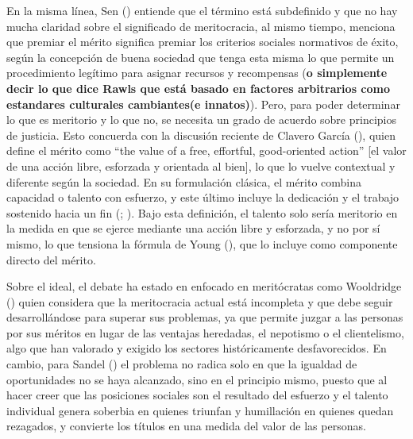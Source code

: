 \documentclass[
  spanish,
  a4paper,
  oneside]{scrbook}
\begin{document}
En la misma línea, Sen ()
entiende que el término está subdefinido y que no hay mucha claridad
sobre el significado de meritocracia, al mismo tiempo, menciona que
premiar el mérito significa premiar los criterios sociales normativos de
éxito, según la concepción de buena sociedad que tenga esta misma lo que
permite un procedimiento legítimo para asignar recursos y recompensas
(\textbf{o simplemente decir lo que dice Rawls que está basado en
factores arbitrarios como estandares culturales cambiantes(e innatos)}).
Pero, para poder determinar lo que es meritorio y lo que no, se necesita
un grado de acuerdo sobre principios de justicia. Esto concuerda con la
discusión reciente de Clavero García (), quien define el mérito como ``the value of a free, effortful,
good-oriented action'' {[}el valor de una acción libre, esforzada y
orientada al bien{]}, lo que lo vuelve contextual y diferente según la
sociedad. En su formulación clásica, el mérito combina capacidad o
talento con esfuerzo, y este último incluye la dedicación y el trabajo
sostenido hacia un fin (; ).
Bajo esta definición, el talento solo sería meritorio en la medida en
que se ejerce mediante una acción libre y esforzada, y no por sí mismo,
lo que tensiona la fórmula de Young (),
que lo incluye como componente directo del mérito.

Sobre el ideal, el debate ha estado en enfocado en meritócratas como
Wooldridge () quien
considera que la meritocracia actual está incompleta y que debe seguir
desarrollándose para superar sus problemas, ya que permite juzgar a las
personas por sus méritos en lugar de las ventajas heredadas, el
nepotismo o el clientelismo, algo que han valorado y exigido los
sectores históricamente desfavorecidos. En cambio, para Sandel
() el problema no radica solo en
que la igualdad de oportunidades no se haya alcanzado, sino en el
principio mismo, puesto que al hacer creer que las posiciones sociales
son el resultado del esfuerzo y el talento individual genera soberbia en
quienes triunfan y humillación en quienes quedan rezagados, y convierte
los títulos en una medida del valor de las personas.
\end{document}
